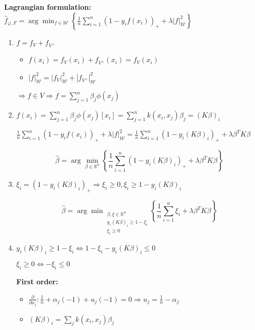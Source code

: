 \documentclass[10pt,a4paper,oneside]{article}
\newcommand{\argmin}{\arg\!\min}
\begin{document}
\textbf{Lagrangian formulation: } $\hat{f}_{\varphi, F} = \argmin_{ f \in \mathcal{W} }  \left\{ \frac{1}{n} \sum_{i = 1}^n (1 - y_i f(x_i))_+ + \lambda |f|^2_\mathcal{W} \right\}$

\begin{enumerate}
\item
$f = f_V + f_{V^\perp}$
\begin{itemize}
\item
$f(x_i) = f_V(x_i) + f_{V^\perp}(x_i) = f_V(x_i)$
\item
$|f|^2_\mathcal{W} = |f_V|^2_\mathcal{W} + |f_{V^\perp}|^2_\mathcal{W}$
\end{itemize}
$\Rightarrow f \in V \Rightarrow f = \sum_{j = 1}^n \beta_j \phi(x_j)$

\item
$f(x_i) = \sum_{j = 1}^n \beta_j \phi(x_j)[x_i] = \sum_{j = 1}^n k(x_i, x_j) \beta_j = (K \beta)_i$

$\frac{1}{n} \sum_{i = 1}^n (1 - y_i f(x_i))_+ + \lambda |f|^2_\mathcal{W} = \frac{1}{n} \sum_{i = 1}^n (1 - y_i (K \beta)_i)_+ + \lambda \beta^T K \beta$

\[ \hat{\beta} = \argmin_{\beta \in \mathbb{R}^n} \left\{ \frac{1}{n} \sum_{i = 1}^n (1 - y_i (K \beta)_i)_+ + \lambda \beta^T K \beta \right\} \]

\item
$\xi_i = (1 - y_i (K \beta)_i)_+ \Rightarrow \xi_i \geq 0, \xi_i \geq 1 - y_i (K \beta)_i$

\[ \hat{\beta} = {\argmin}_{\begin{array}{c}
\beta, \xi \in \mathbb{R}^n \\
y_i (K \beta)_i \geq 1 - \xi_i \\
\xi_i \geq 0
\end{array}} \left\{ \frac{1}{n} \sum_{i = 1}^n \xi_i + \lambda \beta^T K \beta \right\} \]

\item
$y_i (K \beta)_i \geq 1 - \xi_i \Leftrightarrow 1 - \xi_i - y_i (K \beta)_i \leq 0$

$\xi_i \geq 0 \Leftrightarrow -\xi_i \leq 0$

\textbf{First order:}

\begin{itemize}
\item
$\frac{\partial}{\partial x_j} : \frac{1}{n} + \alpha_j (-1) + u_j (-1) = 0 \Rightarrow \hat{u}_j = \frac{1}{n} - \hat{\alpha}_j$

\item
$(K \beta)_i = \sum_j k(x_i,x_j) \beta_j$


\end{itemize}
\end{enumerate}
\end{document}
